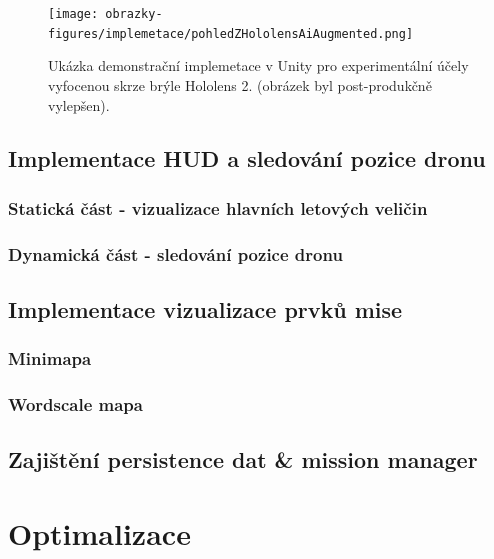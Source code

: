 \begin{figure}[ht]
    \centering
    \texttt{[image: obrazky-figures/implemetace/pohledZHololensAiAugmented.png]}
    \caption{Ukázka demonstrační implemetace v Unity pro experimentální účely vyfocenou skrze brýle Hololens 2. (obrázek byl post-produkčně vylepšen). }
    \label{fig:progress}
\end{figure}

\subsection{Implementace HUD a sledování pozice dronu}

\subsubsection{Statická část - vizualizace hlavních letových veličin}
\subsubsection{Dynamická část - sledování pozice dronu}



\subsection{Implementace vizualizace prvků mise}

\subsubsection{Minimapa}

\subsubsection{Wordscale mapa}



\subsection{Zajištění persistence dat \& mission manager}
\section{Optimalizace}
%


